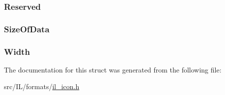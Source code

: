 \hypertarget{struct_i_c_o_d_i_r_e_n_t_r_y_a3a223f4e29c105a474ef8164923f1673}{
\subsubsection[{Reserved}]{ Reserved}}\label{struct_i_c_o_d_i_r_e_n_t_r_y_a3a223f4e29c105a474ef8164923f1673}
\hypertarget{struct_i_c_o_d_i_r_e_n_t_r_y_ad3bfe4c8a6696b42835730f7b70327b7}{
\subsubsection[{Size\-Of\-Data}]{ Size\-Of\-Data}}\label{struct_i_c_o_d_i_r_e_n_t_r_y_ad3bfe4c8a6696b42835730f7b70327b7}
\hypertarget{struct_i_c_o_d_i_r_e_n_t_r_y_a46d103db6e8ada59d4b61b4dc219cc57}{
\subsubsection[{Width}]{ Width}}\label{struct_i_c_o_d_i_r_e_n_t_r_y_a46d103db6e8ada59d4b61b4dc219cc57}


The documentation for this struct was generated from the following file\-:\begin{DoxyCompactItemize}
\item 
src/\-I\-L/formats/\hyperlink{il__icon_8h}{il\-\_\-icon.\-h}\end{DoxyCompactItemize}

